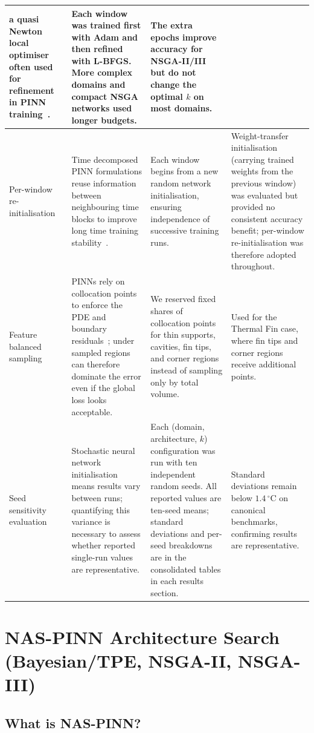\begin{table}[H]
\begin{tabular}{p{}p{}p{}p{}}
a quasi Newton local optimiser often used for refinement in PINN
training~\cite{liu1989,byrd1995}.
& Each window was trained first with Adam and then refined with L-BFGS.  More
complex domains and compact NSGA networks used longer budgets.
& The extra epochs improve accuracy for NSGA-II/III but do not change the
optimal $k$ on most domains. \\
\midrule
Per-window re-initialisation
& Time decomposed PINN formulations reuse information between neighbouring
time blocks to improve long time training stability~\cite{meng2020ppinn,wang2024causality}.
& Each window begins from a new random network initialisation, ensuring
independence of successive training runs.
& Weight-transfer initialisation (carrying trained weights from the previous
window) was evaluated but provided no consistent accuracy benefit; per-window
re-initialisation was therefore adopted throughout. \\
\midrule
Feature balanced sampling
& PINNs rely on collocation points to enforce the PDE and boundary
residuals~\cite{raissi2019,karniadakis2021}; under sampled regions can
therefore dominate the error even if the global loss looks acceptable.
& We reserved fixed shares of collocation points for thin supports, cavities,
fin tips, and corner regions instead of sampling only by total volume.
& Used for the Thermal Fin case, where fin tips and corner regions
receive additional points. \\
\midrule
Seed sensitivity evaluation
& Stochastic neural network initialisation means results vary between runs;
quantifying this variance is necessary to assess whether reported single-run
values are representative.
& Each (domain, architecture, $k$) configuration was run with ten independent
random seeds.  All reported values are ten-seed means; standard deviations
and per-seed breakdowns are in the consolidated tables in each results section.
& Standard deviations remain below $1.4\,^\circ\mathrm{C}$ on canonical
benchmarks, confirming results are representative. \\
\bottomrule
\end{tabular}
\end{table}


\section{NAS-PINN Architecture Search (Bayesian/TPE, NSGA-II, NSGA-III)}
\label{sec:nas_method}

\subsection{What is NAS-PINN?}

